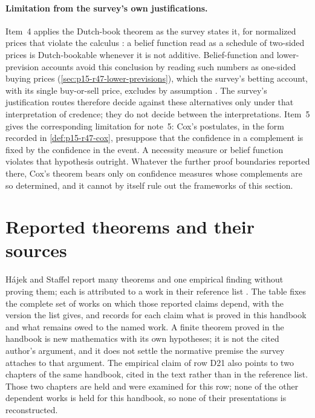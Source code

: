 \paragraph{Limitation from the survey's own justifications.}
Item~4 applies the Dutch-book theorem as the survey states it, for
normalized prices that violate the calculus
\cite[p.~240]{HajekStaffel2021Dynamics}: a belief function read as a
schedule of two-sided prices is Dutch-bookable whenever it is not additive.
Belief-function and lower-prevision accounts avoid this conclusion by
reading such numbers as one-sided buying prices
(\cref{sec:p15-r47-lower-previsions}), which the survey's betting account,
with its single buy-or-sell price, excludes by assumption
\cite[p.~240]{HajekStaffel2021Dynamics}. The survey's justification routes
therefore decide against these alternatives only under that interpretation
of credence; they do not decide between the interpretations. Item~5 gives
the corresponding limitation for note~5: Cox's postulates, in the form
recorded in \cref{def:p15-r47-cox}, presuppose that the confidence in a
complement is fixed by the confidence in the event. A necessity measure or
belief function violates that hypothesis outright. Whatever the further
proof boundaries reported there, Cox's theorem bears only on confidence
measures whose complements are so determined, and it cannot by itself rule
out the frameworks of this section.

\section{Reported theorems and their sources}
\label{sec:p15-w02b-p15-022-dependent-sources}

H\'ajek and Staffel report many theorems and one empirical finding without
proving them; each is attributed to a work in their reference list
\cite[pp.~249--251]{HajekStaffel2021Dynamics}. The table fixes the complete
set of works on which those reported claims depend, with the version the
list gives, and records for each claim what is proved in this handbook and
what remains owed to the named work. A finite theorem proved in the
handbook is new mathematics with its own hypotheses; it is not the cited
author's argument, and it does not settle the normative premise the survey
attaches to that argument. The empirical claim of row D21 also points to
two chapters of the same handbook, cited in the text rather than in the
reference list. Those two chapters are held and were examined for this
row; none of the other dependent works is held for this handbook, so none
of their presentations is reconstructed.

